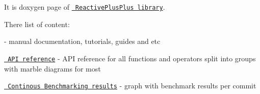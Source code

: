 \label{index_md_docs_2_readme}%
%
 It is doxygen page of \href{https://github.com/victimsnino/ReactivePlusPlus}{\texttt{ Reactive\+Plus\+Plus library}}.

There list of content\+:


\begin{DoxyItemize}
\item {} -\/ manual documentation, tutorials, guides and etc
\item \href{https://victimsnino.github.io/ReactivePlusPlus/docs/html/modules.html}{\texttt{ API reference}} -\/ API reference for all functions and operators split into groups with marble diagrams for most
\item \href{https://victimsnino.github.io/ReactivePlusPlus/benchmark}{\texttt{ Continous Benchmarking results}} -\/ graph with benchmark results per commit 
\end{DoxyItemize}